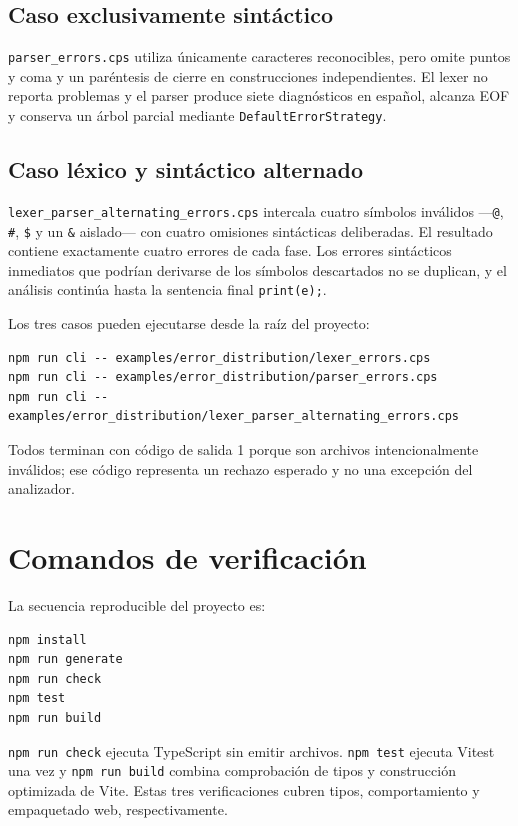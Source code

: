 \documentclass[12pt,letterpaper,oneside]{report}
\newcommand{\archivo}[1]{\texttt{#1}}
\begin{document}
\subsection{Caso exclusivamente sintáctico}

\archivo{parser\_errors.cps} utiliza únicamente caracteres reconocibles, pero omite
puntos y coma y un paréntesis de cierre en construcciones independientes. El lexer no
reporta problemas y el parser produce siete diagnósticos en español, alcanza EOF y
conserva un árbol parcial mediante \archivo{DefaultErrorStrategy}.

\subsection{Caso léxico y sintáctico alternado}

\archivo{lexer\_parser\_alternating\_errors.cps} intercala cuatro símbolos inválidos
---\archivo{@}, \archivo{\#}, \archivo{\$} y un \archivo{\&} aislado--- con cuatro
omisiones sintácticas deliberadas. El resultado contiene exactamente cuatro errores
de cada fase. Los errores sintácticos inmediatos que podrían derivarse de los símbolos
descartados no se duplican, y el análisis continúa hasta la sentencia final
\archivo{print(e);}.

Los tres casos pueden ejecutarse desde la raíz del proyecto:

{\small
\begin{verbatim}
npm run cli -- examples/error_distribution/lexer_errors.cps
npm run cli -- examples/error_distribution/parser_errors.cps
npm run cli -- examples/error_distribution/lexer_parser_alternating_errors.cps
\end{verbatim}
}

Todos terminan con código de salida 1 porque son archivos intencionalmente inválidos;
ese código representa un rechazo esperado y no una excepción del analizador.

\section{Comandos de verificación}

La secuencia reproducible del proyecto es:

\begin{verbatim}
npm install
npm run generate
npm run check
npm test
npm run build
\end{verbatim}

\archivo{npm run check} ejecuta TypeScript sin emitir archivos. \archivo{npm test}
ejecuta Vitest una vez y \archivo{npm run build} combina comprobación de tipos y
construcción optimizada de Vite. Estas tres verificaciones cubren tipos, comportamiento
y empaquetado web, respectivamente.
\end{document}
